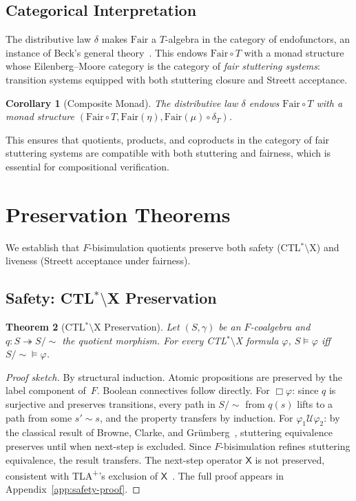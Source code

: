 \documentclass[11pt]{article}
\newtheorem{theorem}{Theorem}
\newtheorem{corollary}[theorem]{Corollary}
\newcommand{\Fair}{\ensuremath{\mathrm{Fair}}}
\newcommand{\TLAplus}{TLA\textsuperscript{+}}
\begin{document}
\subsection{Categorical Interpretation}

The distributive law $\delta$ makes $\Fair$ a $T$-algebra in the category
of endofunctors, an instance of Beck's general theory~\cite{Beck69}.
This endows $\Fair \circ T$ with a monad structure whose Eilenberg--Moore
category is the category of \emph{fair stuttering systems}: transition
systems equipped with both stuttering closure and Streett acceptance.

\begin{corollary}[Composite Monad]
\label{cor:composite}
The distributive law $\delta$ endows $\Fair \circ T$ with a monad structure
$(\Fair \circ T, \Fair(\eta), \Fair(\mu) \circ \delta_T)$.
\end{corollary}

This ensures that quotients, products, and coproducts in the category of
fair stuttering systems are compatible with both stuttering and fairness,
which is essential for compositional verification.

\section{Preservation Theorems}
\label{sec:preservation}

We establish that $F$-bisimulation quotients preserve both safety
(CTL$^*$$\setminus$X) and liveness (Streett acceptance under fairness).

\subsection{Safety: CTL$^*$$\setminus$X Preservation}

\begin{theorem}[CTL$^*$$\setminus$X Preservation]
\label{thm:safety}
Let $(S, \gamma)$ be an $F$-coalgebra and
$q : S \twoheadrightarrow S/{\sim}$ the quotient morphism.
For every CTL$^*$$\setminus$X formula $\varphi$,
$S \models \varphi$ iff $S/{\sim} \models \varphi$.
\end{theorem}

\begin{proof}[Proof sketch]
By structural induction.
Atomic propositions are preserved by the label component of~$F$.
Boolean connectives follow directly.
For $\Box\varphi$: since $q$ is surjective and preserves transitions,
every path in $S/{\sim}$ from $q(s)$ lifts to a path from some
$s' \sim s$, and the property transfers by induction.
For $\varphi_1 \mathbin{\mathcal{U}} \varphi_2$: by the classical result
of Browne, Clarke, and Gr\"umberg~\cite{BrowneCG88}, stuttering
equivalence preserves until when next-step is excluded.
Since $F$-bisimulation refines stuttering equivalence, the result
transfers.
The next-step operator $\mathsf{X}$ is not preserved, consistent with
\TLAplus{}'s exclusion of $\mathsf{X}$~\cite{Lamport94}.
The full proof appears in Appendix~\ref{app:safety-proof}.
\end{proof}
\end{document}

